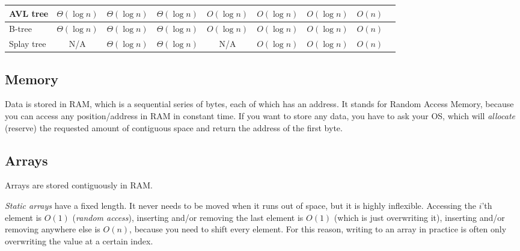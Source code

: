 \documentclass[table, xcdraw]{article}%
\begin{document}
\begin{table}[htbp!]
{\begin{tabular}{|l|c|c|c|c|c|c|c|c|}
    AVL tree & {\cellcolor{yellowgreen!30}$\Theta(\log n)$} & {\cellcolor{yellowgreen!30}$\Theta(\log n)$} & {\cellcolor{yellowgreen!30}$\Theta(\log n)$} & {\cellcolor{yellowgreen!30}$O(\log n)$} & {\cellcolor{yellowgreen!30}$O(\log n)$} & {\cellcolor{yellowgreen!30}$O(\log n)$} & {\cellcolor{yellow!30}$O(n)$} \\ \hline
    B-tree & {\cellcolor{yellowgreen!30}$\Theta(\log n)$} & {\cellcolor{yellowgreen!30}$\Theta(\log n)$} & {\cellcolor{yellowgreen!30}$\Theta(\log n)$} & {\cellcolor{yellowgreen!30}$O(\log n)$} & {\cellcolor{yellowgreen!30}$O(\log n)$} & {\cellcolor{yellowgreen!30}$O(\log n)$} & {\cellcolor{yellow!30}$O(n)$} \\ \hline
    Splay tree & {\cellcolor{gray!30}N/A} & {\cellcolor{yellowgreen!30}$\Theta(\log n)$} & {\cellcolor{yellowgreen!30}$\Theta(\log n)$} & {\cellcolor{gray!30}N/A} & {\cellcolor{yellowgreen!30}$O(\log n)$} & {\cellcolor{yellowgreen!30}$O(\log n)$} & {\cellcolor{yellow!30}$O(n)$} \\ \hline
    \end{tabular}
    }
\end{table}

\subsection{Memory}

Data is stored in RAM, which is a sequential series of bytes, each of which has an address. It stands for Random Access Memory, because you can access any position/address in RAM in constant time. If you want to store any data, you have to ask your OS, which will \emph{allocate} (reserve) the requested amount of contiguous space and return the address of the first byte.

\subsection{Arrays}

Arrays are stored contiguously in RAM.

\emph{Static arrays} have a fixed length. It never needs to be moved when it runs out of space, but it is highly inflexible. Accessing the $i$'th element is $O(1)$ (\emph{random access}), inserting and/or removing the last element is $O(1)$ (which is just overwriting it), inserting and/or removing anywhere else is $O(n)$, because you need to shift every element. For this reason, writing to an array in practice is often only overwriting the value at a certain index.
\end{document}
